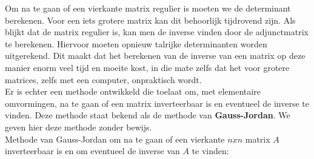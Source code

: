 Om na te gaan of een vierkante matrix regulier is moeten we de determinant berekenen. Voor een iets grotere matrix kan dit behoorlijk tijdrovend zijn. Als blijkt dat de matrix regulier is, kan men de inverse vinden door de adjunctmatrix te berekenen. Hiervoor moeten opnieuw talrijke determinanten worden uitgerekend. Dit maakt dat het berekenen van de inverse van een matrix op deze manier enorm veel tijd en moeite kost, in die mate zelfs dat het voor grotere matrices, zelfs met een computer, onpraktisch wordt.\\

Er is echter een methode ontwikkeld die toelaat om, met elementaire omvormingen, na te gaan of een matrix inverteerbaar is en eventueel de inverse te vinden. Deze methode staat bekend als de methode van {\bf Gauss-Jordan}. 
We geven hier deze methode zonder bewijs.\\

Methode van Gauss-Jordan om na te gaan of een vierkante $nxn$ matrix $A$ inverteerbaar is en om eventueel de inverse van $A$ te vinden:\\

